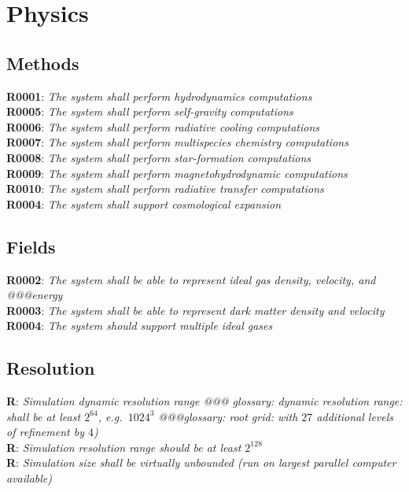 \documentclass{book}
\newcommand{\req}[2]{\textbf{R#1}: \textit{#2} \\}
\begin{document}
\section{Physics}

\subsection{Methods}

\req{0001}{The system shall perform hydrodynamics computations}
\req{0005}{The system shall perform self-gravity computations}
\req{0006}{The system shall perform radiative cooling computations}
\req{0007}{The system shall perform multispecies chemistry computations}
\req{0008}{The system shall perform star-formation computations}
\req{0009}{The system shall perform magnetohydrodynamic computations}
\req{0010}{The system shall perform radiative transfer computations}

\req{0004}{The system shall support cosmological expansion}

\subsection{Fields}

\req{0002}{The system shall be able to represent ideal gas density, velocity, and @@@energy}
\req{0003}{The system shall be able to represent dark matter density and velocity}
\req{0004}{The system should support multiple ideal gases}

%
\subsection{Resolution}
\req{}{Simulation dynamic resolution range @@@ glossary: dynamic resolution range: shall be at least $2^64$, e.g.~$1024^3$ @@@glossary: root grid: with $27$ additional levels of refinement by $4$)}
\req{}{Simulation resolution range should be at least $2^128$}
\req{}{Simulation size shall be virtually unbounded (run on largest parallel computer available)}
\end{document}
